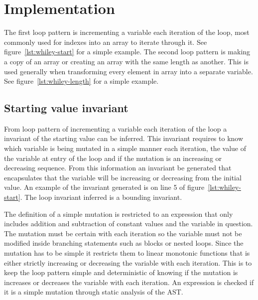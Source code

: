 \chapter{Implementation}\label{C:impl}
%


The first loop pattern is incrementing a variable
each iteration of the loop, most commonly used for indexes into an array to
iterate through it. See figure~\ref{lst:whiley-start} for a simple example.
The second loop pattern is making a copy of an array or creating an array with
the same length as another.
This is used generally when transforming every element in array into a separate
variable. See figure~\ref{lst:whiley-length} for a simple example.

\section{Starting value invariant}

From loop pattern of incrementing a variable each iteration of the loop
a invariant of the starting value can be inferred.
This invariant requires to know which variable is being
mutated in a simple manner each iteration,
the value of the variable at entry of the loop and if the mutation is an
increasing or decreasing sequence.
From this information an invariant be generated that encapsulates that the
variable will be increasing or decreasing from the initial value.
An example of the invariant generated is on line 5 of
figure~\ref{lst:whiley-start}.
The loop invariant inferred is a bounding invariant.

The definition of a simple mutation is restricted to an expression that only
includes addition and subtraction of constant values and the variable in question.
The mutation must be certain with each iteration so the variable must not be
modified inside branching statements such as  blocks or nested loops.
Since the mutation has to be simple it restricts them to linear monotonic
functions that is either strictly increasing or decreasing the variable with each iteration.
This is to keep the loop pattern simple and deterministic of knowing if the
mutation is increases or decreases the variable with each iteration.
An expression is checked if it is a simple mutation through static analysis of
the AST.

